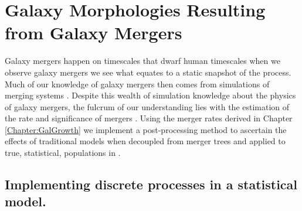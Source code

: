 \section{Galaxy Morphologies Resulting from Galaxy Mergers}

Galaxy mergers happen on timescales that dwarf human timescales when we observe galaxy mergers we see what equates to a static snapshot of the process. Much of our knowledge of galaxy mergers then comes from simulations of merging systems \cite[e..g.][]{Hopkins2006ASpheroids,Hopkins2009TheDemographics, Hopkins2010MergersRate,Hopkins2009HOWMERGERS,Hopkins2010MERGERSMATTER,OLeary2020EMERGE:zsim6,Fensch2017High-redshiftFormation,Stewart2008MergerSurvival,Stewart2009GALAXYDEPENDENCE}. Despite this wealth of simulation knowledge about the physics of galaxy mergers, the fulcrum of our understanding lies with the estimation of the rate and significance of mergers \cite{Hopkins2010MERGERSMATTER, Hopkins2010MergersRate}. Using the merger rates derived in Chapter \ref{Chapter:GalGrowth} we implement a post-processing method to ascertain the effects of traditional models when decoupled from merger trees and applied to true, statistical, populations in \steel.

\subsection{Implementing discrete processes in a statistical model.}

